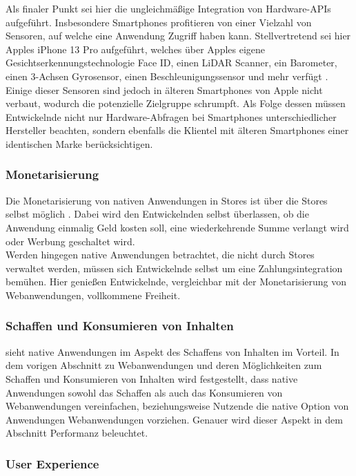 \documentclass[a4paper]{scrartcl}
\begin{document}
Als finaler Punkt sei hier die ungleichmäßige Integration von Hardware-APIs aufgeführt. Insbesondere Smartphones profitieren von einer Vielzahl von Sensoren, auf welche eine Anwendung Zugriff haben kann. Stellvertretend sei hier Apples iPhone 13 Pro aufgeführt, welches über Apples eigene Gesichtserkennungstechnologie Face ID, einen LiDAR Scanner, ein Barometer, einen 3-Achsen Gyrosensor, einen Beschleunigungssensor und mehr verfügt \autocite{iPhone13_specs}. Einige dieser Sensoren sind jedoch in älteren Smartphones von Apple nicht verbaut, wodurch die potenzielle Zielgruppe schrumpft. Als Folge dessen müssen Entwickelnde nicht nur Hardware-Abfragen bei Smartphones unterschiedlicher Hersteller beachten, sondern ebenfalls die Klientel mit älteren Smartphones einer identischen Marke berücksichtigen.


\subsubsection{Monetarisierung}

Die Monetarisierung von nativen Anwendungen in Stores ist über die Stores selbst möglich \autocite{Appstore_Connect}. Dabei wird den Entwickelnden selbst überlassen, ob die Anwendung einmalig Geld kosten soll, eine wiederkehrende Summe verlangt wird oder Werbung geschaltet wird. \\
Werden hingegen native Anwendungen betrachtet, die nicht durch Stores verwaltet werden, müssen sich Entwickelnde selbst um eine Zahlungsintegration bemühen. Hier genießen Entwickelnde, vergleichbar mit der Monetarisierung von Webanwendungen, vollkommene Freiheit.


\subsubsection{Schaffen und Konsumieren von Inhalten}

\textcite[28]{Jobe} sieht native Anwendungen im Aspekt des Schaffens von Inhalten im Vorteil. In dem vorigen Abschnitt zu Webanwendungen und deren Möglichkeiten zum Schaffen und Konsumieren von Inhalten wird festgestellt, dass native Anwendungen sowohl das Schaffen als auch das Konsumieren von Webanwendungen vereinfachen, beziehungsweise Nutzende die native Option von Anwendungen Webanwendungen vorziehen. Genauer wird dieser Aspekt in dem Abschnitt Performanz beleuchtet.


\subsubsection{User Experience}
\end{document}
